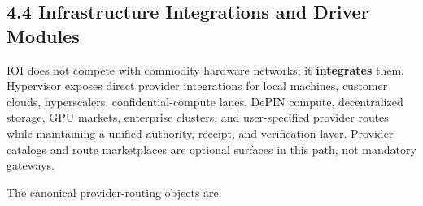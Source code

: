 \documentclass[
  11pt,
]{article}
\begin{document}
\hypertarget{infrastructure-integrations-and-driver-modules}{%
\subsection{4.4 Infrastructure Integrations and Driver
Modules}\label{infrastructure-integrations-and-driver-modules}}

IOI does not compete with commodity hardware networks; it
\textbf{integrates} them. Hypervisor exposes direct provider
integrations for local machines, customer clouds, hyperscalers,
confidential-compute lanes, DePIN compute, decentralized storage, GPU
markets, enterprise clusters, and user-specified provider routes while
maintaining a unified authority, receipt, and verification layer.
Provider catalogs and route marketplaces are optional surfaces in this path,
not mandatory gateways.

The canonical provider-routing objects are:
\end{document}
